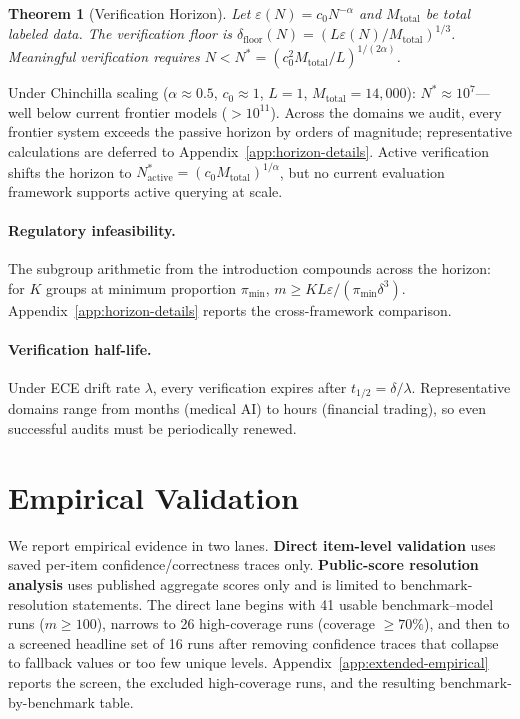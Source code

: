 \documentclass{article}
\newcommand{\Lip}{L}
\newcommand{\errrate}{\varepsilon}
\newcommand{\nsamples}{m}
\newcommand{\groupprop}{\pi}
\newcommand{\targetacc}{\delta}
\newcommand{\modelsize}{N}
\newcommand{\totaldata}{M_{\mathrm{total}}}
\newcommand{\horizonN}{N^*}
\newcommand{\scalingexp}{\alpha}
\newcommand{\verfloor}{\delta_{\mathrm{floor}}}
\newcommand{\halflife}{t_{1/2}}
\newcommand{\driftrate}{\lambda}
\newtheorem{theorem}{Theorem}
\theoremstyle{definition}
\begin{document}
\begin{theorem}[Verification Horizon]
\label{thm:horizon}
Let $\errrate(\modelsize) = c_0\modelsize^{-\scalingexp}$ and $\totaldata$ be total labeled data. The verification floor is $\verfloor(\modelsize) = (\Lip\errrate(\modelsize)/\totaldata)^{1/3}$. Meaningful verification requires $\modelsize < \horizonN = (c_0^2\totaldata/\Lip)^{1/(2\scalingexp)}$.
\end{theorem}

Under Chinchilla scaling ($\scalingexp \approx 0.5$, $c_0 \approx 1$, $\Lip = 1$, $\totaldata = 14{,}000$): $\horizonN \approx 10^7$---well below current frontier models ($>10^{11}$). Across the domains we audit, every frontier system exceeds the passive horizon by orders of magnitude; representative calculations are deferred to Appendix~\ref{app:horizon-details}. Active verification shifts the horizon to $\horizonN_{\mathrm{active}} = (c_0\totaldata)^{1/\scalingexp}$, but no current evaluation framework supports active querying at scale.

\paragraph{Regulatory infeasibility.} The subgroup arithmetic from the introduction compounds across the horizon: for $K$ groups at minimum proportion $\groupprop_{\min}$, $\nsamples \geq K\Lip\errrate/(\groupprop_{\min}\targetacc^3)$. Appendix~\ref{app:horizon-details} reports the cross-framework comparison.

\paragraph{Verification half-life.} Under ECE drift rate $\driftrate$, every verification expires after $\halflife = \targetacc/\driftrate$. Representative domains range from months (medical AI) to hours (financial trading), so even successful audits must be periodically renewed.

\section{Empirical Validation}
\label{sec:empirics}

We report empirical evidence in two lanes. \textbf{Direct item-level validation} uses saved per-item confidence/correctness traces only. \textbf{Public-score resolution analysis} uses published aggregate scores only and is limited to benchmark-resolution statements. The direct lane begins with 41 usable benchmark--model runs ($m \ge 100$), narrows to 26 high-coverage runs (coverage $\ge 70\%$), and then to a screened headline set of 16 runs after removing confidence traces that collapse to fallback values or too few unique levels. Appendix~\ref{app:extended-empirical} reports the screen, the excluded high-coverage runs, and the resulting benchmark-by-benchmark table.
\end{document}
